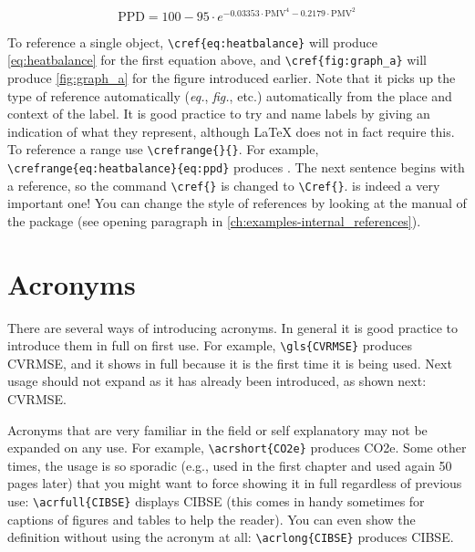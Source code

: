 \documentclass[11pt,twoside,openright]{report}
\begin{document}
\begin{equation}\label{eq:ppd}
    \text{PPD} = 100 - 95 \cdot e^{-0.03353 \cdot \text{PMV}^4 - 0.2179 \cdot \text{PMV}^2}
\end{equation}

To reference a single object, \verb|\cref{eq:heatbalance}| will produce \cref{eq:heatbalance} for the first equation above, and  \verb|\cref{fig:graph_a}| will produce \cref{fig:graph_a} for the figure introduced earlier.
Note that it picks up the type of reference automatically (\emph{eq.},\emph{ fig.}, etc.) automatically from the place and context of the label.
It is good practice to try and name labels by giving an indication of what they represent, although \LaTeX{} does not in fact require this.
To reference a range use \verb|\crefrange{}{}|.
For example, \verb|\crefrange{eq:heatbalance}{eq:ppd}| produces .
The next sentence begins with a reference, so the command \verb|\cref{}| is changed to \verb|\Cref{}|.
 is indeed a very important one!
You can change the style of references by looking at the manual of the package (see opening paragraph in \cref{ch:examples-internal_references}).


\section{Acronyms}

There are several ways of introducing acronyms. 
In general it is good practice to introduce them in full on first use. 
For example, \verb|\gls{CVRMSE}| produces \gls{CVRMSE}, and it shows in full because 
it is the first time it is being used.
Next usage should not expand as it has already been introduced, as shown next: \gls{CVRMSE}.

Acronyms that are very familiar in the field or self explanatory may not be expanded on any use.
For example, \verb|\acrshort{CO2e}| produces \acrshort{CO2e}.
Some other times, the usage is so sporadic 
(e.g., used in the first chapter and used again 50 pages later)
that you might want to force showing it in full regardless of previous use: 
\verb|\acrfull{CIBSE}| displays \acrfull{CIBSE}
(this comes in handy sometimes for captions of figures and tables to help the reader).
You can even show the definition without using the acronym at all: 
\verb|\acrlong{CIBSE}| produces \acrlong{CIBSE}.


\end{document}
